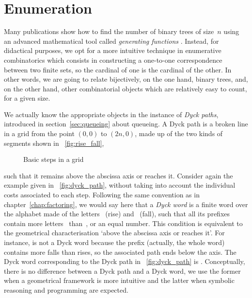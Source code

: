 \section{Enumeration}

Many publications \cite[\S~2.3.4.4]{Knuth_1997}
\cite[\S~5.1]{SedgewickFlajolet_1996} show how to find the number of
binary trees of size~\(n\) using an advanced mathematical tool called
\emph{generating functions} \cite[chap.~7]{GrahamKnuthPatashnik_1994}. Instead, for
didactical purposes, we opt for a more intuitive technique in
enumerative combinatorics which
consists in constructing a one\hyp{}to\hyp{}one correspondence between
two finite sets, so the cardinal of one is the cardinal of the
other. In other words, we are going to relate bijectively, on the one
hand, binary trees, and, on the other hand, other combinatorial
objects which are relatively easy to count, for a given size.

We actually know the appropriate objects in the instance of \emph{Dyck
  paths}, introduced in section~\ref{sec:queueing}
about queueing. A Dyck path is a broken line in a grid
from the point \((0,0)\) to \((2n,0)\), made up of the two kinds of
segments shown in \fig~\vref{fig:rise_fall},
\begin{figure}[b]
\centering
{}
\qquad
{}
\caption{Basic steps in a grid}
\label{fig:rise_fall}
\end{figure}
such that it remains above the abscissa axis or reaches it. Consider
again the example given in \fig~\vref{fig:dyck_path}, without taking
into account the individual costs associated to each step. Following
the same convention as in chapter~\ref{chap:factoring}, we would say
here that a \emph{Dyck word} is a
finite word over the alphabet made of the letters~
(rise) and~ (fall),
such that all its prefixes contain more
letters~ than~, or an equal number. This condition is
equivalent to the geometrical characterisation `above the abscissa
axis or reaches it'.  For instance,  is not a Dyck word
because the prefix  (actually, the whole word) contains more
falls than rises, so the associated path ends below the axis. The Dyck
word corresponding to the Dyck path in \fig~\vref{fig:dyck_path} is
. Conceptually, there is no difference between a
Dyck path and a Dyck word, we use the former when a geometrical
framework is more intuitive and the latter when symbolic reasoning and
programming are expected.

